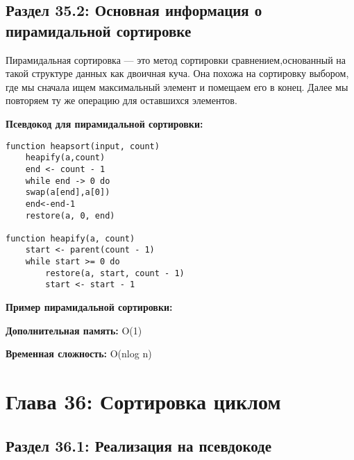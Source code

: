 \section*{Раздел 35.2: Основная информация о пирамидальной
сортировке} 

\vspace{\baselineskip}
Пирамидальная сортировка — это метод сортировки сравнением,основанный на такой структуре данных как двоичная куча. Она похожа на сортировку выбором, где мы сначала ищем максимальный элемент и помещаем его в конец. Далее мы повторяем ту же операцию для оставшихся элементов.

\vspace{\baselineskip}
\textbf{Псевдокод для пирамидальной сортировки:}

\vspace{\baselineskip}
\begin{tcolorbox}
\begin{verbatim} 
function heapsort(input, count)
	heapify(a,count)
	end <- count - 1
	while end -> 0 do
	swap(a[end],a[0])
	end<-end-1
	restore(a, 0, end)
	
function heapify(a, count)
	start <- parent(count - 1)
	while start >= 0 do
		restore(a, start, count - 1)
		start <- start - 1

\end{verbatim}
\end{tcolorbox}

\vspace{\baselineskip}
\textbf{Пример пирамидальной сортировки:}

\vspace{\baselineskip}

\vspace{\baselineskip}
\textbf{Дополнительная память:} O(1)

\textbf{Временная сложность:} O(nlog n)

\vspace{\baselineskip}

\chapter*{Глава 36: Сортировка циклом}
\section*{Раздел 36.1: Реализация на псевдокоде} 

